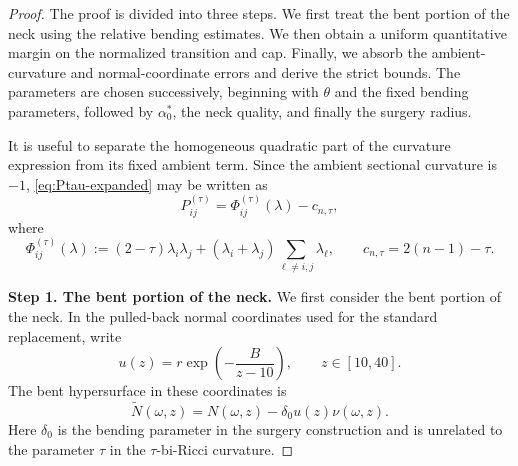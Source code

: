 \documentclass[11pt,reqno]{amsart}
\theoremstyle{definition}
\theoremstyle{remark}
\numberwithin{equation}{section}
\begin{document}
\begin{proof}
 The proof is divided into three steps.  We first treat the bent portion
of the neck using the relative bending estimates.  We then obtain a
uniform quantitative margin on the normalized transition and cap.
Finally, we absorb the ambient-curvature and normal-coordinate errors
and derive the strict bounds.  The parameters are chosen successively,
beginning with $\theta$ and the fixed bending parameters, followed by
$\alpha_0^*$, the neck quality, and finally the surgery radius.

  It is useful to separate the homogeneous quadratic part of the curvature
  expression from its fixed ambient term.  Since the ambient sectional
  curvature is $-1$, \eqref{eq:Ptau-expanded} may be written as
  \begin{equation}\label{eq:surgery-Phi-definition}
    P_{ij}^{(\tau)}
    =
    \Phi_{ij}^{(\tau)}(\lambda)-c_{n,\tau},
  \end{equation}
  where
  \begin{equation*}
  \Phi_{ij}^{(\tau)}(\lambda)
  :=
  (2-\tau)\lambda_i\lambda_j
  +(\lambda_i+\lambda_j)
  \sum_{\ell\ne i,j}\lambda_\ell,
  \qquad
  c_{n,\tau}=2(n-1)-\tau.
  \end{equation*}

\textbf{Step 1. The bent portion of the neck.}   We first consider the bent portion of the neck.  In the pulled-back normal
  coordinates used for the standard replacement, write
  \begin{equation*}
  u(z)
  =
  r\exp\left(-\frac{B}{z-10}\right),
  \qquad
  z\in[10,40].
  \end{equation*}
  The bent hypersurface in these coordinates is
  \begin{equation*}
  \widetilde N(\omega,z)
  =
  N(\omega,z)-\delta_0u(z)\nu(\omega,z).
  \end{equation*}
  Here $\delta_0$ is the bending parameter in the surgery construction and is
  unrelated to the parameter $\tau$ in the $\tau$-bi-Ricci curvature.


\end{proof}
\end{document}
